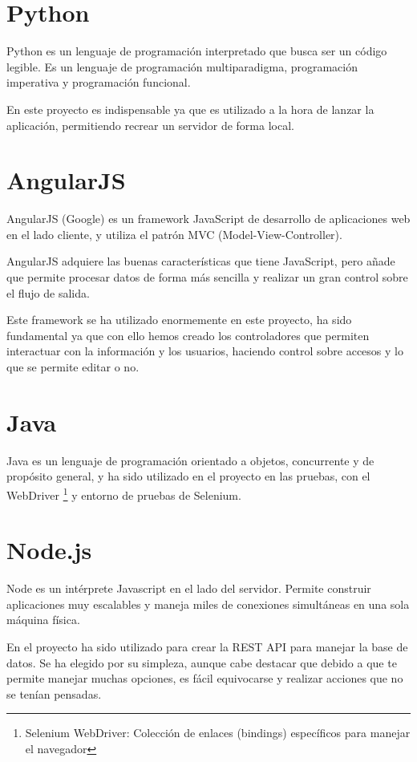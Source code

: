 \section{Python}\label{python}

Python es un lenguaje de programación interpretado que busca ser un código legible. Es un lenguaje de programación multiparadigma, programación imperativa y programación funcional.

En este proyecto es indispensable ya que es utilizado a la hora de lanzar la aplicación, permitiendo recrear un servidor de forma local.

\section{AngularJS}\label{AngularJS}

AngularJS (Google) es un framework JavaScript de desarrollo de aplicaciones web en el lado cliente, y utiliza el patrón MVC (Model-View-Controller).

AngularJS adquiere las buenas características que tiene JavaScript, pero añade que permite procesar datos de forma más sencilla y realizar un gran control sobre el flujo de salida.

Este framework se ha utilizado enormemente en este proyecto, ha sido fundamental ya que con ello hemos creado los controladores que permiten interactuar con la información y los usuarios, haciendo control sobre accesos y lo que se permite editar o no.

\section{Java}\label{java}

Java es un lenguaje de programación orientado a objetos, concurrente y de propósito general, y ha sido utilizado en el proyecto en las pruebas, con el WebDriver \footnote{Selenium WebDriver: Colección de enlaces (bindings) específicos para manejar el navegador} y entorno de pruebas de Selenium.

\section{Node.js}\label{Node.js}

Node es un intérprete Javascript en el lado del servidor. Permite construir aplicaciones muy escalables y  maneja miles de conexiones simultáneas en una sola máquina física.

En el proyecto ha sido utilizado para crear la REST API para manejar la base de datos. Se ha elegido por su simpleza, aunque cabe destacar que debido a que te permite manejar muchas opciones, es fácil equivocarse y realizar acciones que no se tenían pensadas.

